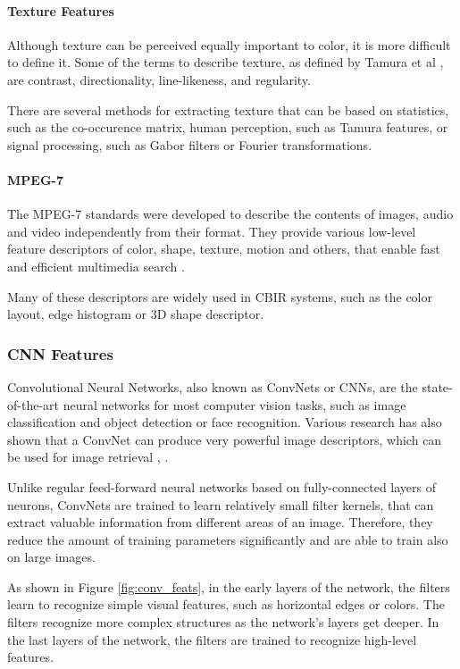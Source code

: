 \documentclass{article}
\begin{document}
\paragraph{Texture Features}
Although texture can be perceived equally important to color, it is more difficult to define it.  Some of the terms to describe texture, as defined by Tamura et al \cite{tamura1978textural}, are contrast, directionality, line-likeness, and regularity.

There are several methods for extracting texture that can be based on statistics, such as the co-occurence matrix, human perception, such as Tamura features, or signal processing, such as Gabor filters or Fourier transformations.

\paragraph{MPEG-7}
The MPEG-7 standards were developed to describe the contents of images, audio and video independently from their format. They provide various low-level feature descriptors of color, shape, texture, motion and others, that enable fast and efficient multimedia search \cite{noauthor_visual_nodate}.

Many of these descriptors are widely used in CBIR systems, such as the color layout, edge histogram or 3D shape descriptor.

\pagebreak
\subsubsection{CNN Features}
Convolutional Neural Networks, also known as ConvNets or CNNs, are the state-of-the-art neural networks for most computer vision tasks, such as image classification and object detection or face recognition. Various research has also shown that a ConvNet can produce very powerful image descriptors, which can be used for image retrieval \cite{razavian_cnn_2014-2}, \cite{NIPS2012_4824}.

Unlike regular feed-forward neural networks based on fully-connected layers of neurons, ConvNets are trained to learn relatively small filter kernels, that can extract valuable information from different areas of an image. Therefore, they reduce the amount of training parameters significantly and are able to train also on large images.

As shown in Figure \ref{fig:conv_feats}, in the early layers of the network, the filters learn to recognize simple visual features, such as horizontal edges or colors. The filters recognize more complex structures as the network's layers get deeper. In the last layers of the network, the filters are trained to recognize high-level features. 
\end{document}
